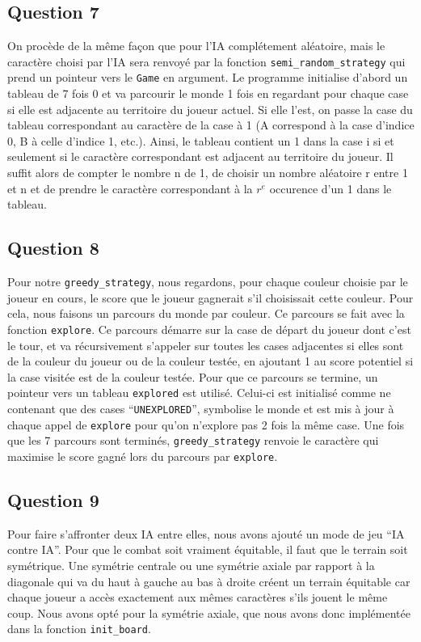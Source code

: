\documentclass{article}
\begin{document}
\subsection{Question 7}
    On procède de la même façon que pour l'IA complétement aléatoire, mais le caractère choisi par l'IA sera renvoyé par la fonction \texttt{semi\_random\_strategy} qui prend un pointeur vers le \texttt{Game} en argument. Le programme initialise d'abord un tableau de 7 fois 0 et va parcourir le monde 1 fois en regardant pour chaque case si elle est adjacente au territoire du joueur actuel. Si elle l'est, on passe la case du tableau correspondant au caractère de la case à 1 (A correspond à la case d'indice 0, B à celle d'indice 1, etc.). Ainsi, le tableau contient un 1 dans la case i si et seulement si le caractère correspondant est adjacent au territoire du joueur. Il suffit alors de compter le nombre n de 1, de choisir un nombre aléatoire r entre 1 et n et de prendre le caractère correspondant à la $r^e$ occurence d'un 1 dans le tableau.
\subsection{Question 8}
    Pour notre \texttt{greedy\_strategy}, nous regardons, pour chaque couleur choisie par le joueur en cours, le score que le joueur gagnerait s'il choisissait cette couleur. Pour cela, nous faisons un parcours du monde par couleur. Ce parcours se fait avec la fonction \texttt{explore}. Ce parcours démarre sur la case de départ du joueur dont c'est le tour, et va récursivement s'appeler sur toutes les cases adjacentes si elles sont de la couleur du joueur ou de la couleur testée, en ajoutant 1 au score potentiel si la case visitée est de la couleur testée. Pour que ce parcours se termine, un pointeur vers un tableau \texttt{explored} est utilisé. Celui-ci est initialisé comme ne contenant que des cases \enquote{\texttt{UNEXPLORED}}, symbolise le monde et est mis à jour à chaque appel de \texttt{explore} pour qu'on n'explore pas 2 fois la même case. Une fois que les 7 parcours sont terminés, \texttt{greedy\_strategy} renvoie le caractère qui maximise le score gagné lors du parcours par \texttt{explore}.
\subsection{Question 9}
    Pour faire s'affronter deux IA entre elles, nous avons ajouté un mode de jeu \enquote{IA contre IA}. Pour que le combat soit vraiment équitable, il faut que le terrain soit symétrique. Une symétrie centrale ou une symétrie axiale par rapport à la diagonale qui va du haut à gauche au bas à droite créent un terrain équitable car chaque joueur a accès exactement aux mêmes caractères s'ils jouent le même coup. Nous avons opté pour la symétrie axiale, que nous avons donc implémentée dans la fonction \texttt{init\_board}.
\end{document}
